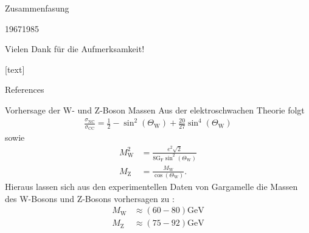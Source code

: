 \documentclass[aspectratio=1610, professionalfonts, 10pt]{beamer}
\begin{document}
\begin{frame}{Zusammenfasung}
	\begin{chronology}[3]{1967}{1985}{\textwidth}		
	\end{chronology}
\end{frame}



\begin{frame}[focus]
	Vielen Dank für die Aufmerksamkeit!
\end{frame}


\appendix

[text]


\begin{frame}[allowframebreaks]{References}
	
	
\end{frame}


\begin{frame}{Vorhersage der W- und Z-Boson Massen}
			Aus der elektroschwachen Theorie folgt \cite{vorhersage}
			\begin{align*}
				\frac{\sigma_\text{NC}}{\sigma_\text{CC}} = \frac{1}{2} - \sin^2{\left( \Theta_\text{W}\right)} + \frac{20}{27} \sin^4{\left( \Theta_\text{W}\right)}
			\end{align*}
			sowie
			\begin{align*}
				M_\text{W}^2 &= \frac{e^2 \sqrt{2}}{8 \text{G}_\text{F} \sin^2{\left( \Theta_\text{W}\right)} }\\
				M_\text{Z} &= \frac{M_\text{W}}{\cos{\left( \Theta_\text{W}  \right)}}.
			\end{align*}
			Hieraus lassen sich aus den experimentellen Daten von Gargamelle die Massen des W-Bosons und Z-Bosons vorhersagen zu
			\cite{doi:10.1142/9789814644150_0006}:
			\begin{align*}
				M_\text{W} &\approx \left(60-80\right)\si{\giga\electronvolt}\\
				M_\text{Z} &\approx \left(75-92\right)\si{\giga\electronvolt}
			\end{align*}
\end{frame}
\end{document}
